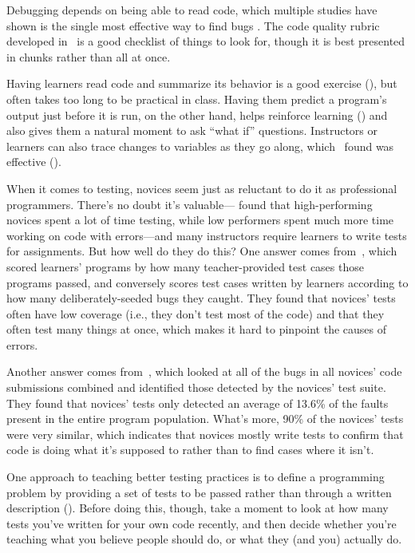 Debugging depends on being able to read code,
which multiple studies have shown is the single most effective way to find bugs \cite{Basi1987,Keme2009,Bacc2013}.
The code quality rubric developed in~\cite{Steg2014,Steg2016a}
is a good checklist of things to look for,
though it is best presented in chunks rather than all at once.

Having learners read code and summarize its behavior is a good exercise (),
but often takes too long to be practical in class.
Having them predict a program's output just before it is run,
on the other hand,
helps reinforce learning ()
and also gives them a natural moment to ask ``what if'' questions.
Instructors or learners can also trace changes to variables as they go along,
which~\cite{Cunn2017} found was effective ().

When it comes to testing,
novices seem just as reluctant to do it as professional programmers.
There's no doubt it's valuable---\cite{Cart2017} found that high-performing novices spent a lot of time testing,
while low performers spent much more time working on code with errors---and many instructors
require learners to write tests for assignments.
But how well do they do this?
One answer comes from~\cite{Bria2015},
which scored learners' programs by how many teacher-provided test cases those programs passed,
and conversely scores test cases written by learners according to how many deliberately-seeded bugs they caught.
They found that novices' tests often have low coverage (i.e., they don't test most of the code)
and that they often test many things at once, which makes it hard to pinpoint the causes of errors.

Another answer comes from~\cite{Edwa2014b},
which looked at all of the bugs in all novices' code submissions combined
and identified those detected by the novices' test suite.
They found that novices' tests only detected an average of 13.6\% of the faults present in the entire program population.
What's more,
90\% of the novices' tests were very similar,
which indicates that novices mostly write tests to confirm that code is doing what it's supposed to
rather than to find cases where it isn't.

One approach to teaching better testing practices is
to define a programming problem by providing a set of tests to be passed
rather than through a written description ().
Before doing this,
though,
take a moment to look at how many tests you've written for your own code recently,
and then decide whether you're teaching what you believe people should do,
or what they (and you) actually do.

